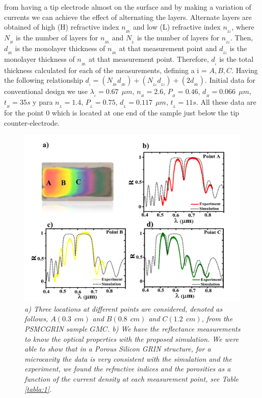 \documentclass{article}
\begin{document}
from having a tip electrode almost on the surface and by making a
variation of currents we can achieve the effect of alternating the
layers. Alternate layers are obtained of high (H) refractive index
$n_{_{Hi}}$ and low (L) refractive index $n_{_{Li}}$, where $N_{_{H}}$
is the number of layers for  $n_{_{Hi}}$ and $N_{_{L}}$ is the number
of layers for $n_{_{Li}}$. Then,  $d_{_{Hi}}$ is the monolayer
thickness of  $n_{_{Hi}}$ at that measurement point and $d_{_{Li}}$ is
the monolayer thickness of $n_{_{Hi}}$ at that measurement
point. Therefore,  $d_{_{i}}$ is the total thickness calculated for
each of the measurements, defining a i = $ A, B, C$. Having the
following relationship $d_{_{i}} =
(N_{_{Hi}}d_{_{Hi}})+(N_{_{Li}}d_{_{Li}}) + (2d_{_{Hi}})$.
Initial data for conventional design we use  $\lambda_{_{c}}= 0.67 \ \
\mu m$, $n_{_{H}} =2.6$, $P_{_{H}} =0.46$, $d_{_{H}}=0.066 \ \ \mu m
$, $t_{_{H}}=35 s  $ y para  $n_{_{L}}= 1.4$,  $P_{_{L}} =0.75$,
$d_{_{L}}=0.117 \ \ \mu m  $, $t_{_{L}}=11 s  $. All these data are
for the point $ 0 $ which is located at one end of the sample just
below the tip counter-electrode.
\begin{figure}
  \centering
  \includegraphics[scale=.5]{Images/MCGRIN2}
  \caption{\emph{a) Three locations at different points are
      considered, denoted as follows, $ A (0.3 \ \ cm) $ and $ B
      (0.8 \ \ cm) $ and $ C (1.2 \ \ cm) $, from the PSMCGRIN
      sample $ GMC $. b) We have the reflectance measurements to
      know the optical properties with the proposed
      simulation. We were able to show that in a Porous Silicon
      GRIN structure, for a microcavity the data is very
      consistent with the simulation and the experiment, we
      found the refractive indices and the porosities as a
      function of the current density at each measurement point,
      see Table \ref{tabla:1}. }}
  \label{fig:MCGRIN3}
\end{figure}
\end{document}
